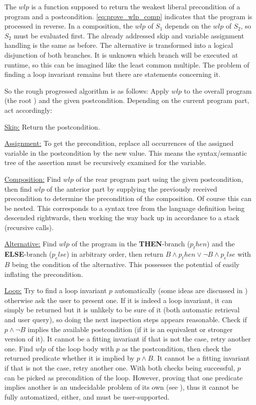 The $wlp$ is a function supposed to return the weakest liberal precondition of a program and a postcondition. \eqref{eq:prove_wlp_comp} indicates that the program is processed in reverse. In a composition, the $wlp$ of $S_1$ depends on the $wlp$ of $S_2$, so $S_2$ must be evaluated first. The already addressed skip and variable assignment handling is the same as before. The alternative is transformed into a logical disjunction of both branches. It is unknown which branch will be executed at runtime, so this can be imagined like the least common multiple. The problem of finding a loop invariant remains but there are statements concerning it.

So the rough progressed algorithm is as follows: Apply $wlp$ to the overall program (the root ) and the given postcondition. Depending on the current program part, act accordingly:

\underline{Skip:}
Return the postcondition.

\underline{Assignment:}
To get the precondition, replace all occurrences of the assigned variable in the postcondition by the new value. This means the syntax/semantic tree of the assertion must be recursively examined for the variable.

\underline{Composition:}
Find $wlp$ of the rear program part using the given postcondition, then find $wlp$ of the anterior part by supplying the previously received precondition to determine the precondition of the composition. Of course this can be nested. This corresponds to a syntax tree from the language definition being descended rightwards, then working the way back up in accordance to a stack (recursive calls).

\underline{Alternative:}
Find $wlp$ of the program in the \textbf{THEN}-branch ($p_then$) and the \textbf{ELSE}-branch ($p_else$) in arbitrary order, then return $B\land p_then\lor \lnot B\land p_else$ with $B$ being the condition of the alternative. This possesses the potential of easily inflating the precondition.

\underline{Loop:}
Try to find a loop invariant $p$ automatically (some ideas are discussed in ) otherwise ask the user to present one. If it is indeed a loop invariant, it can simply be returned but it is unlikely to be sure of it (both automatic retrieval and user query), so doing the next inspection steps appears reasonable. Check if $p\land \lnot B$ implies the available postcondition (if it is an equivalent or stronger version of it). It cannot be a fitting invariant if that is not the case, retry another one. Find $wlp$ of the loop body with $p$ as the postcondition, then check the returned predicate whether it is implied by $p \land B$. It cannot be a fitting invariant if that is not the case, retry another one. With both checks being successful, $p$ can be picked as precondition of the loop. However, proving that one predicate implies another is an undecidable problem of its own (see ), thus it cannot be fully automatized, either, and must be user-supported.

